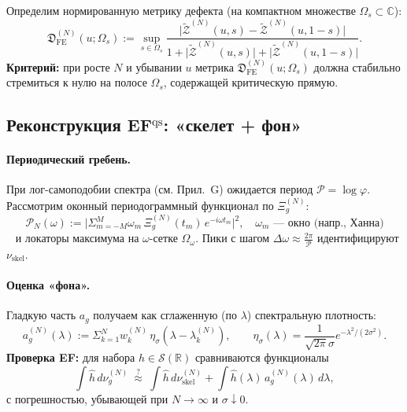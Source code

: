 \documentclass{article}
\numberwithin{equation}{section}
\theoremstyle{plain}
\theoremstyle{definition}
\theoremstyle{remark}
\def\eta{η}\def\mu{μ}\def\nu{ν}\def\lambda{λ}\def\Lambda{Λ}%
\def\omega{ω}\def\Omega{Ω}\def\hbar{ℏ}\def\nabla{∇}%
\def\infty{∞}\def\partial{∂}\def\sum{Σ}\def\int{∫}%
\begin{document}
Определим нормированную метрику дефекта (на компактном множестве \(\Omega_s\subset\mathbb C\)):
\begin{equation}\label{eq:H-FE-defect}
  \mathfrak D_{\mathrm{FE}}^{(N)}(u;\Omega_s):=
  \sup_{s\in\Omega_s}\frac{\big|\widetilde{\mathcal Z}^{(N)}(u,s)-\widetilde{\mathcal Z}^{(N)}(u,1-s)\big|}
  {1+\big|\widetilde{\mathcal Z}^{(N)}(u,s)\big|+\big|\widetilde{\mathcal Z}^{(N)}(u,1-s)\big|}.
\end{equation}
\textbf{Критерий:} при росте \(N\) и убывании \(u\) метрика \(\mathfrak D_{\mathrm{FE}}^{(N)}(u;\Omega_s)\) должна стабильно стремиться к нулю на полосе \(\Omega_s\), содержащей критическую прямую.

\subsection*{Реконструкция EF$^{\mathrm{qs}}$: «скелет + фон»}

\paragraph{Периодический гребень.}
При лог-самоподобии спектра (см. Прил.~G) ожидается период \(\mathcal P=\log\varphi\).
Рассмотрим оконный периодограммный функционал по \(\Xi_g^{(N)}\):
\begin{equation}\label{eq:H-periodogram}
  \mathcal P_N(\omega):=\Big|\sum_{m=-M}^{M} \omega_m\,\Xi_g^{(N)}(t_m)\,e^{-i\omega t_m}\Big|^2,
  \quad \omega_m \text{ — окно (напр., Ханна)}
\end{equation} ~\cite{StoicaMoses2005}
и локаторы максимума на \(\omega\)-сетке \(\Omega_\omega\).
Пики с шагом \(\Delta\omega\approx \frac{2\pi}{\mathcal P}\) идентифицируют \(\nu_{\mathrm{skel}}\).

\paragraph{Оценка «фона».}
Гладкую часть \(a_g\) получаем как сглаженную (по \(\lambda\)) спектральную плотность:
\begin{equation}\label{eq:H-ag}
  a_g^{(N)}(\lambda):=\sum_{k=1}^N w_k^{(N)}\,\eta_\sigma(\lambda-\lambda_k^{(N)}),\qquad
  \eta_\sigma(\lambda)=\frac{1}{\sqrt{2\pi}\sigma}e^{-\lambda^2/(2\sigma^2)}.
\end{equation}
\textbf{Проверка EF:} для набора \(h\in\mathcal S(\mathbb R)\) сравниваются функционалы
\begin{equation}\label{eq:H-EF-test}
  \int \widehat h\,d\nu_g^{(N)}\ \stackrel{?}{\approx}\ \int \widehat h\,d\nu_{\mathrm{skel}}^{(N)}+\int \widehat h(\lambda)\,a_g^{(N)}(\lambda)\,d\lambda,
\end{equation}
с погрешностью, убывающей при \(N\to\infty\) и \(\sigma\downarrow 0\).
\end{document}
